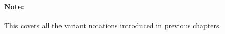 \begin{description}
  \paragraph{Note:} This covers all the variant notations introduced
  in previous chapters.










\end{description}
